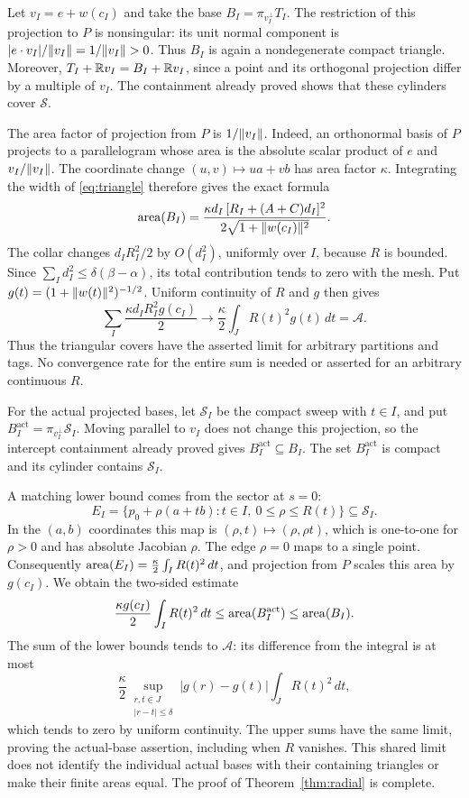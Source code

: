 

Let $v_I=e+w(c_I)$ and take the base
$B_I=\pi_{v_I^\perp}T_I$. The restriction of this projection to
$P$ is nonsingular: its unit normal component is
$|e\cdot v_I|/\lVert v_I\rVert=1/\lVert v_I\rVert>0$.
Thus $B_I$ is again a nondegenerate compact triangle.
Moreover, $T_I+\mathbb R v_I=B_I+\mathbb R v_I$, since a point and its
orthogonal projection differ by a multiple of $v_I$.
The containment already proved shows that these cylinders cover
$\mathcal S$.

The area factor of projection from $P$ is $1/\lVert v_I\rVert$.
Indeed, an orthonormal basis of $P$ projects to a parallelogram
whose area is the absolute scalar product of $e$ and
$v_I/\lVert v_I\rVert$. The coordinate change $(u,v)\mapsto u a+v b$
has area factor $\kappa$. Integrating the width of
\eqref{eq:triangle} therefore gives the exact formula
\begin{equation}\label{eq:triangle-area}
 \operatorname{area}(B_I)=
 \frac{\kappa d_I\,[R_I+(A+C)d_I]^2}
      {2\sqrt{1+\lVert w(c_I)\rVert^2}}.
\end{equation}
The collar changes $d_IR_I^2/2$ by $O(d_I^2)$, uniformly over $I$,
because $R$ is bounded. Since
$\sum_I d_I^2\le\delta(\beta-\alpha)$, its total contribution tends
to zero with the mesh. Put
$g(t)=(1+\lVert w(t)\rVert^2)^{-1/2}$. Uniform continuity of $R$ and $g$
then gives
\[
 \sum_I\frac{\kappa d_I R_I^2g(c_I)}2
 \longrightarrow\frac\kappa2\int_J R(t)^2g(t)\,dt=\mathcal A.
\]
Thus the triangular covers have the asserted limit for arbitrary
partitions and tags. No convergence rate for the entire sum is needed
or asserted for an arbitrary continuous $R$.

For the actual projected bases, let $\mathcal S_I$ be the compact
sweep with $t\in I$, and put $B_I^{\mathrm{act}}=\pi_{v_I^\perp}\mathcal S_I$.
Moving parallel to $v_I$ does not change this projection, so the
intercept containment already proved gives $B_I^{\mathrm{act}}\subseteq B_I$.
The set $B_I^{\mathrm{act}}$ is compact and its cylinder contains
$\mathcal S_I$.

A matching lower bound comes from the sector at $s=0$:
\[
 E_I=\{p_0+\rho(a+tb):t\in I,\ 0\le\rho\le R(t)\}
 \subseteq\mathcal S_I.
\]
In the $(a,b)$ coordinates this map is $(\rho,t)\mapsto(\rho,\rho t)$,
which is one-to-one for $\rho>0$ and has absolute Jacobian $\rho$.
The edge $\rho=0$ maps to a single point. Consequently
$\operatorname{area}(E_I)=\frac\kappa2\int_I R(t)^2\,dt$, and projection from $P$
scales this area by $g(c_I)$. We obtain the two-sided estimate
\begin{equation}\label{eq:actual-sweep-squeeze}
 \frac{\kappa g(c_I)}2\int_I R(t)^2\,dt
 \le\operatorname{area}(B_I^{\mathrm{act}})\le\operatorname{area}(B_I).
\end{equation}
The sum of the lower bounds tends to $\mathcal A$: its difference
from the integral is at most
\[
 \frac\kappa2\sup_{\substack{r,t\in J\\|r-t|\le\delta}}
 |g(r)-g(t)|\int_J R(t)^2\,dt,
\]
which tends to zero by uniform continuity. The upper sums have the
same limit, proving the actual-base assertion, including when $R$
vanishes. This shared limit does not identify the individual actual
bases with their containing triangles or make their finite areas equal.
The proof of Theorem~\ref{thm:radial} is complete.
